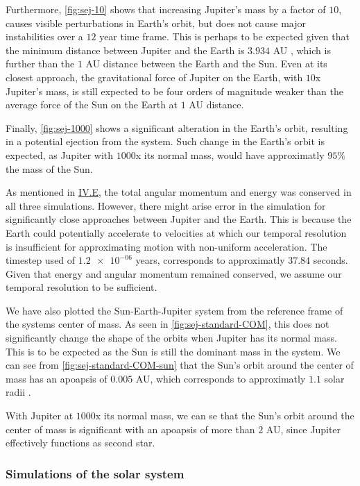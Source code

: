 \documentclass[reprint,english,notitlepage]{revtex4-1}  %
\begin{document}
Furthermore, \ref{fig:sej-10} shows that increasing Jupiter's mass by a factor of \(10\), causes visible perturbations in Earth's orbit, but does not cause major instabilities over a \(12\) year time frame. This is perhaps to be expected given that the minimum distance between Jupiter and the Earth is \(3.934\) AU \citep{NASA2014}, which is further than the \(1\) AU distance between the Earth and the Sun. Even at its closest approach, the gravitational force of Jupiter on the Earth, with \(10\)x Jupiter's mass, is still expected to be four orders of magnitude weaker than the average force of the Sun on the Earth at \(1\) AU distance.

Finally, \ref{fig:sej-1000} shows a significant alteration in the Earth's orbit, resulting in a potential ejection from the system. Such change in the Earth's orbit is expected, as Jupiter with \(1000\)x its normal mass, would have approximatly \(95\%\) the mass of the Sun.

As mentioned in \hyperref[sec:IV:e]{IV.E}, the total angular momentum and energy was conserved in all three simulations. However, there might arise error in the simulation for significantly close approaches between Jupiter and the Earth. This is because the Earth could potentially accelerate to velocities at which our temporal resolution is insufficient for approximating motion with non-uniform acceleration. The timestep used of \(\num{1.2e-06}\) years, corresponds to approximatly \(37.84\) seconds. Given that energy and angular momentum remained conserved, we assume our temporal resolution to be sufficient.

We have also plotted the Sun-Earth-Jupiter system from the reference frame of the systems center of mass. As seen in \ref{fig:sej-standard-COM}, this does not significantly change the shape of the orbits when Jupiter has  its normal mass. This is to be expected as the Sun is still the dominant mass in the system. We can see from \ref{fig:sej-standard-COM-sun} that the Sun's orbit around the center of mass has an apoapsis of \(0.005\) AU, which corresponds to approximatly \(1.1\) solar radii \citep{Emilio2012}.

With Jupiter at \(1000\)x its normal mass, we can se that the Sun's orbit around the center of mass is significant with an apoapsis of more than \(2\) AU, since Jupiter effectively functions as second star. 

\subsubsection{Simulations of the solar system} \label{sec:V:c:ii}
\end{document}
